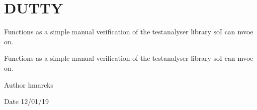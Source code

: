 \hypertarget{group__DUTTY}{}\section{D\+U\+T\+TY}
\label{group__DUTTY}


Functions as a simple manual verification of the testanalyser library soI can mvoe on.  


Functions as a simple manual verification of the testanalyser library soI can mvoe on. 

\begin{DoxyAuthor}{Author}
hmarcks
\end{DoxyAuthor}
\begin{DoxyDate}{Date}
12/01/19 
\end{DoxyDate}
